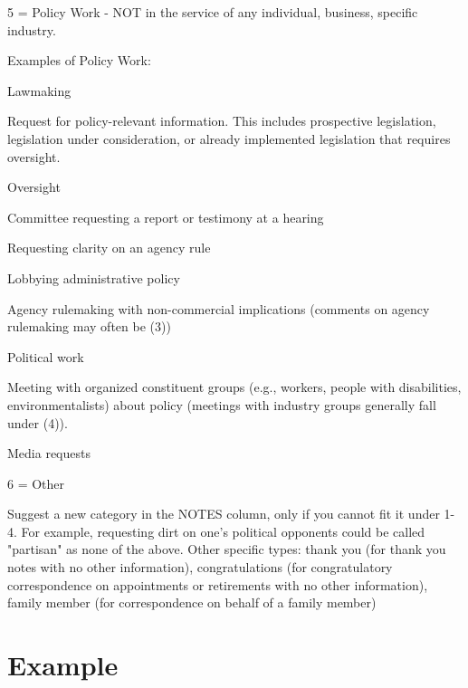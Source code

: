 \documentclass[12pt]{article}
\newenvironment{tight_itemize}{
\begin{itemize}
 \setlength{\itemsep}{0pt}
 \setlength{\parskip}{0pt}
 }{\end{itemize}}
\begin{document}
5 = Policy Work - NOT in the service of any individual, business, specific industry.\\

\hfill\begin{minipage}{\dimexpr\textwidth-2cm}
Examples of Policy Work: 
 \begin{tight_itemize} 
 \item Lawmaking 
\item Request for policy-relevant information. This includes prospective legislation, legislation under consideration, or already implemented legislation that requires oversight.  
\item Oversight
\item Committee requesting a report or testimony at a hearing
\item Requesting clarity on an agency rule
\item Lobbying administrative policy
\item Agency rulemaking with non-commercial implications (comments on agency rulemaking may often be (3)) 
\item Political work
\item Meeting with organized constituent groups (e.g., workers, people with disabilities, environmentalists) about policy (meetings with industry groups generally fall under (4)).
\item Media requests
 \end{tight_itemize} 
\end{minipage}
\bigskip


6 = Other \\

\hfill\begin{minipage}{\dimexpr\textwidth-2cm}
	Suggest a new category in the NOTES column, only if you cannot fit it under 1-4. For example, requesting dirt on one's political opponents could be called "partisan" as none of the above. Other specific types: thank you (for thank you notes with no other information), congratulations (for congratulatory correspondence on appointments or retirements with no other information), family member (for correspondence on behalf of a family member) \\
\end{minipage}

\clearpage

\section{Example} 
\end{document}
